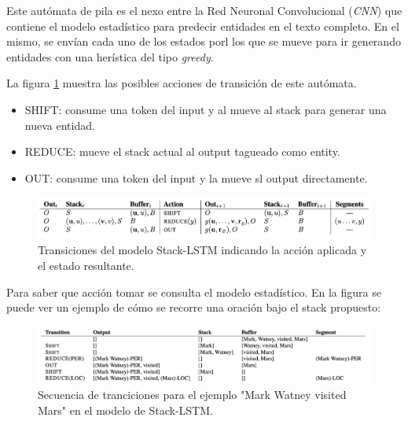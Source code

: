 \documentclass[12pt,a4paper,]{scrartcl}
\providecommand{\tightlist}{%
  \setlength{\itemsep}{0pt}\setlength{\parskip}{0pt}}
\begin{document}
Este autómata de pila es el nexo entre la Red Neuronal Convolucional (\emph{CNN}) que contiene el modelo estadístico para predecir entidades en el texto completo. En el mismo, se envían cada uno de los estados porl los que se mueve para ir generando entidades con una herística del tipo \emph{greedy}.

La figura \ref{fig:lampe-1} muestra las posibles acciones de transición de este autómata.

\begin{itemize}
\tightlist
\item
  SHIFT: consume una token del input y al mueve al stack para generar una nueva entidad.
\item
  REDUCE: mueve el stack actual al output tagueado como entity.
\item
  OUT: consume una token del input y la mueve sl output directamente.
\end{itemize}

\begin{figure}[H]

{\centering \includegraphics{assets/lampe_1.pdf} 

}

\caption{Transiciones del modelo Stack-LSTM indicando la acción aplicada y el estado resultante.}\label{fig:lampe-1}
\end{figure}

Para saber que acción tomar se consulta el modelo estadístico. En la figura se puede ver un ejemplo de cómo se recorre una oración bajo el stack propuesto:

\begin{figure}[H]

{\centering \includegraphics{assets/lampe_2.pdf} 

}

\caption{Secuencia de tranciciones para el ejemplo "Mark Watney visited Mars" en el modelo de Stack-LSTM.}\label{fig:lampe-2}
\end{figure}
\end{document}
